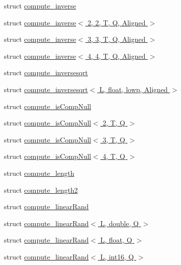 \begin{DoxyCompactItemize}
\item 
struct \hyperlink{structglm_1_1detail_1_1compute__inverse}{compute\+\_\+inverse}
\item 
struct \hyperlink{structglm_1_1detail_1_1compute__inverse_3_012_00_012_00_01_t_00_01_q_00_01_aligned_01_4}{compute\+\_\+inverse$<$ 2, 2, T, Q, Aligned $>$}
\item 
struct \hyperlink{structglm_1_1detail_1_1compute__inverse_3_013_00_013_00_01_t_00_01_q_00_01_aligned_01_4}{compute\+\_\+inverse$<$ 3, 3, T, Q, Aligned $>$}
\item 
struct \hyperlink{structglm_1_1detail_1_1compute__inverse_3_014_00_014_00_01_t_00_01_q_00_01_aligned_01_4}{compute\+\_\+inverse$<$ 4, 4, T, Q, Aligned $>$}
\item 
struct \hyperlink{structglm_1_1detail_1_1compute__inversesqrt}{compute\+\_\+inversesqrt}
\item 
struct \hyperlink{structglm_1_1detail_1_1compute__inversesqrt_3_01_l_00_01float_00_01lowp_00_01_aligned_01_4}{compute\+\_\+inversesqrt$<$ L, float, lowp, Aligned $>$}
\item 
struct \hyperlink{structglm_1_1detail_1_1compute__is_comp_null}{compute\+\_\+is\+Comp\+Null}
\item 
struct \hyperlink{structglm_1_1detail_1_1compute__is_comp_null_3_012_00_01_t_00_01_q_01_4}{compute\+\_\+is\+Comp\+Null$<$ 2, T, Q $>$}
\item 
struct \hyperlink{structglm_1_1detail_1_1compute__is_comp_null_3_013_00_01_t_00_01_q_01_4}{compute\+\_\+is\+Comp\+Null$<$ 3, T, Q $>$}
\item 
struct \hyperlink{structglm_1_1detail_1_1compute__is_comp_null_3_014_00_01_t_00_01_q_01_4}{compute\+\_\+is\+Comp\+Null$<$ 4, T, Q $>$}
\item 
struct \hyperlink{structglm_1_1detail_1_1compute__length}{compute\+\_\+length}
\item 
struct \hyperlink{structglm_1_1detail_1_1compute__length2}{compute\+\_\+length2}
\item 
struct \hyperlink{structglm_1_1detail_1_1compute__linear_rand}{compute\+\_\+linear\+Rand}
\item 
struct \hyperlink{structglm_1_1detail_1_1compute__linear_rand_3_01_l_00_01double_00_01_q_01_4}{compute\+\_\+linear\+Rand$<$ L, double, Q $>$}
\item 
struct \hyperlink{structglm_1_1detail_1_1compute__linear_rand_3_01_l_00_01float_00_01_q_01_4}{compute\+\_\+linear\+Rand$<$ L, float, Q $>$}
\item 
struct \hyperlink{structglm_1_1detail_1_1compute__linear_rand_3_01_l_00_01int16_00_01_q_01_4}{compute\+\_\+linear\+Rand$<$ L, int16, Q $>$}

\end{DoxyCompactItemize}

